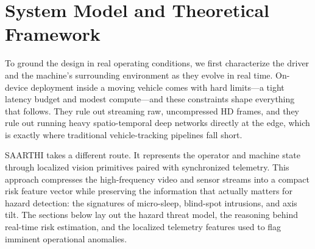 \section{System Model and Theoretical Framework}

To ground the design in real operating conditions, we first characterize the driver and the machine's surrounding environment as they evolve in real time. On-device deployment inside a moving vehicle comes with hard limits---a tight latency budget and modest compute---and these constraints shape everything that follows. They rule out streaming raw, uncompressed HD frames, and they rule out running heavy spatio-temporal deep networks directly at the edge, which is exactly where traditional vehicle-tracking pipelines fall short.

SAARTHI takes a different route. It represents the operator and machine state through localized vision primitives paired with synchronized telemetry. This approach compresses the high-frequency video and sensor streams into a compact risk feature vector while preserving the information that actually matters for hazard detection: the signatures of micro-sleep, blind-spot intrusions, and axis tilt. The sections below lay out the hazard threat model, the reasoning behind real-time risk estimation, and the localized telemetry features used to flag imminent operational anomalies.

\begin{table}[htbp]
\centering
\caption{Comparative Analysis of Operator Safety Paradigms}
\label{tab:comparative_analysis}
\end{table}

